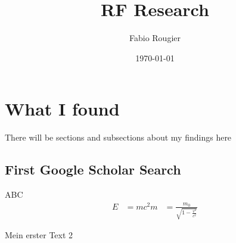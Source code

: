 \documentclass[a4paper, 12pt]{article}
\title{RF Research}
\author{Fabio Rougier}
\date{\today}
\begin{document}
\maketitle
\tableofcontents

\section{What I found}
There will be sections and subsections about my findings here

\subsection{First Google Scholar Search}

ABC
\begin{align}
    E &= mc^2
    m &= \frac{m_0}{\sqrt{1-\frac{v^2}{c^2}}}
\end{align}

Mein erster Text 2
\end{document}
